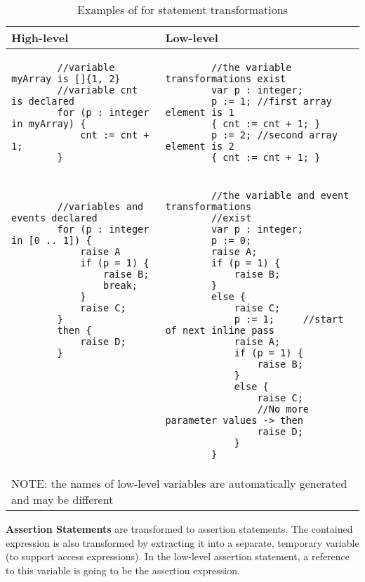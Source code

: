 \begin{table}[H]
	\footnotesize
	\centering
	\begin{tabular}{ p{7cm} p{7cm} }
		\toprule
		High-level & Low-level \\
		\midrule
		\begin{lstlisting}
		//variable myArray is []{1, 2}
		//variable cnt is declared
		for (p : integer in myArray) {
			cnt := cnt + 1;
		}
		\end{lstlisting} & 
		\begin{lstlisting}
		//the variable transformations exist
		var p : integer;
		p := 1;	//first array element is 1
		{ cnt := cnt + 1; }
		p := 2;	//second array element is 2
		{ cnt := cnt + 1; }\end{lstlisting} \\
		\begin{lstlisting}
		//variables and events declared
		for (p : integer in [0 .. 1]) {
			raise A
			if (p = 1) {
				raise B;
				break;
			} 
			raise C;
		}
		then {
			raise D;
		}
		
		
		
		
		
		
		
		
		\end{lstlisting} & 
		\begin{lstlisting}
		//the variable and event transformations
		//exist
		var p : integer;
		p := 0;
		raise A;
		if (p = 1) {
			raise B;
		}
		else {
			raise C;
			p := 1;		//start of next inline pass
			raise A;
			if (p = 1) {
				raise B;
			}
			else {
				raise C;
				//No more parameter values -> then
				raise D;
			}
		}\end{lstlisting} \\
		\bottomrule
		\multicolumn{2}{l}{NOTE: the names of low-level variables are automatically generated and may be different}
	\end{tabular}
	\caption{Examples of for statement transformations}
	\label{tab:SCLLForStatementExample}
\end{table}

\bigskip
\textbf{Assertion Statements} are transformed to assertion statements. The contained expression is also transformed by extracting it into a separate, temporary variable (to support access expressions). In the low-level assertion statement, a reference to this variable is going to be the assertion expression.

